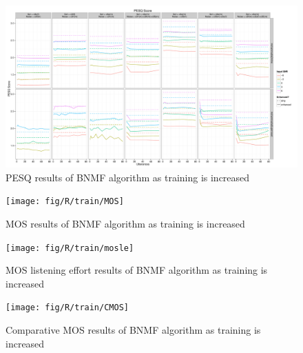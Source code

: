 \begin{figure}[p]
\noindent \begin{centering}
\includegraphics[angle=90,width=1\textwidth,height=0.95\textheight]{fig/R/train/pesq}
\par\end{centering}

\protect\caption{\label{fig:vary-train-pesq}\acs{PESQ} results of \acs{BNMF} algorithm
as training is increased}
\end{figure}


\begin{figure}[p]
\noindent \begin{centering}
\texttt{[image: fig/R/train/MOS]}
\par\end{centering}

\protect\caption{\label{fig:vary-train-mos}\acs{MOS} results of \acs{BNMF} algorithm
as training is increased}
\end{figure}


\begin{figure}[p]
\noindent \begin{centering}
\texttt{[image: fig/R/train/mosle]}
\par\end{centering}

\protect\caption{\label{fig:vary-train-mosle}\acs{MOS} listening effort results of
\acs{BNMF} algorithm as training is increased}
\end{figure}


\begin{figure}[p]
\noindent \begin{centering}
\texttt{[image: fig/R/train/CMOS]}
\par\end{centering}

\protect\caption{\label{fig:vary-train-cmos}Comparative \acs{MOS} results of \acs{BNMF}
algorithm as training is increased}
\end{figure}



